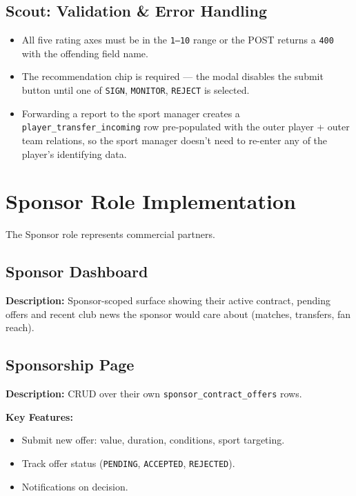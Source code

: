 \documentclass[12pt,a4paper,oneside]{report}
\begin{document}
\subsection*{Scout: Validation \& Error Handling}
\begin{itemize}[leftmargin=*]
  \item All five rating axes must be in the \texttt{1--10} range
        or the POST returns a \texttt{400} with the offending
        field name.
  \item The recommendation chip is required --- the modal disables
        the submit button until one of \texttt{SIGN},
        \texttt{MONITOR}, \texttt{REJECT} is selected.
  \item Forwarding a report to the sport manager creates a
        \texttt{player\_transfer\_incoming} row pre-populated with
        the outer player + outer team relations, so the sport
        manager doesn't need to re-enter any of the player's
        identifying data.
\end{itemize}

\section{Sponsor Role Implementation}
\label{sec:impl-sponsor}

The Sponsor role represents commercial partners.

\subsection*{Sponsor Dashboard}

\textbf{Description:} Sponsor-scoped surface showing their active
contract, pending offers and recent club news the sponsor would care
about (matches, transfers, fan reach).

\subsection*{Sponsorship Page}

\textbf{Description:} CRUD over their own
\texttt{sponsor\_contract\_offers} rows.

\textbf{Key Features:}
\begin{itemize}[leftmargin=*]
  \item Submit new offer: value, duration, conditions, sport
        targeting.
  \item Track offer status (\texttt{PENDING}, \texttt{ACCEPTED},
        \texttt{REJECTED}).
  \item Notifications on decision.
\end{itemize}
\end{document}
